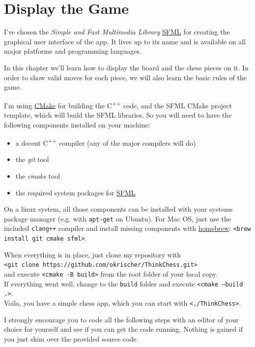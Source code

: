 \chapter{Display the Game}

I've chosen the \emph{Simple and Fast Multimedia Library}
\href{https://www.sfml-dev.org/index.php}{SFML} for creating the graphical user interface
of the app.
It lives up to its name and is available on all major platforms and programming languages.

In this chapter we'll learn how to display the board and the chess pieces on it.
In order to show valid moves for each piece, we will also learn the basic rules of the game.

I'm using \href{https://cmake.org/}{CMake} for building the C\textsuperscript{++} code,
and the SFML CMake project template, which will build the SFML libraries.
So you will need to have the following components installed on your machine:

\begin{itemize}
  \item a decent C\textsuperscript{++} compiler (any of the major compilers will do)
  \item the \emph{git} tool
  \item the \emph{cmake} tool
  \item the required system packages for
    \href{https://www.sfml-dev.org/tutorials/2.6/start-cmake.php}{SFML}
\end{itemize}
 
On a linux system, all those components can be installed with your systems package manager
(e.g. with \texttt{apt-get} on Ubuntu).
For Mac OS, just use the included \texttt{clang++} compiler and install
missing components with \href{https://brew.sh/}{homebrew}:
\texttt{<brew install git cmake sfml>}.

When everything is in place, just clone my repository with\\
\texttt{<git clone https://github.com/okrischer/ThinkChess.git>}\\
and execute \texttt{<cmake -B build>} from the root folder of your local copy.\\
If everything went well, change to the \texttt{build} folder and execute \texttt{<cmake --build .>}.\\
Voila, you have a simple chess app, which you can start with \texttt{<./ThinkChess>}.

I strongly encourage you to code all the following steps with an editor of your choice
for yourself and see if you can get the code running. Nothing is gained if you just skim
over the provided source code.

